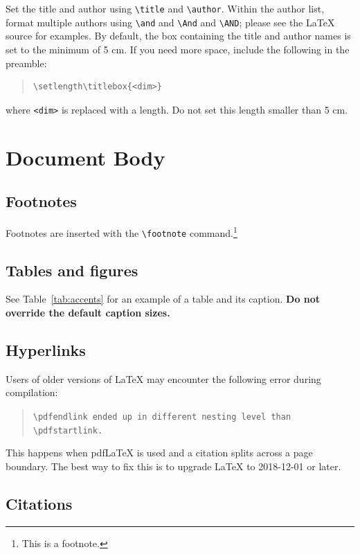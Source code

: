 \documentclass[11pt]{article}
\begin{document}
Set the title and author using \verb|\title| and \verb|\author|. Within the author list, format multiple authors using \verb|\and| and \verb|\And| and \verb|\AND|; please see the \LaTeX{} source for examples.
By default, the box containing the title and author names is set to the minimum of 5 cm. If you need more space, include the following in the preamble:
\begin{quote}
\begin{verbatim}
\setlength\titlebox{<dim>}
\end{verbatim}
\end{quote}
where \verb|<dim>| is replaced with a length. Do not set this length smaller than 5 cm.

\section{Document Body}

\subsection{Footnotes}

Footnotes are inserted with the \verb|\footnote| command.\footnote{This is a footnote.}

\subsection{Tables and figures}

See Table~\ref{tab:accents} for an example of a table and its caption.
\textbf{Do not override the default caption sizes.}

\subsection{Hyperlinks}

Users of older versions of \LaTeX{} may encounter the following error during compilation: 
\begin{quote}
\tt\verb|\pdfendlink| ended up in different nesting level than \verb|\pdfstartlink|.
\end{quote}
This happens when pdf\LaTeX{} is used and a citation splits across a page boundary. The best way to fix this is to upgrade \LaTeX{} to 2018-12-01 or later.

\subsection{Citations}
\end{document}
